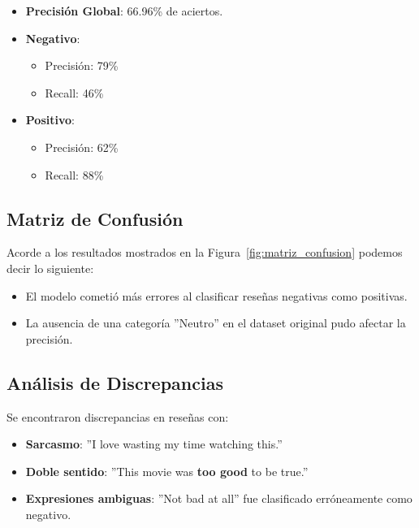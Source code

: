 \documentclass[conference]{IEEEtran}
\begin{document}
\begin{itemize}
    \item \textbf{Precisión Global}: 66.96\% de aciertos.
    \item \textbf{Negativo}:
        \begin{itemize}
            \item Precisión: 79\%
            \item Recall: 46\%
        \end{itemize}
    \item \textbf{Positivo}:
        \begin{itemize}
            \item Precisión: 62\%
            \item Recall: 88\%
        \end{itemize}
\end{itemize}


\subsection{Matriz de Confusión}

Acorde a los resultados mostrados en la Figura~\ref{fig:matriz_confusion} podemos decir lo siguiente:

\begin{itemize}
	\item El modelo cometió más errores al clasificar reseñas negativas como positivas. 
	\item La ausencia de una categoría ''Neutro'' en el dataset original pudo afectar la precisión.
\end{itemize}



\subsection{Análisis de Discrepancias}

Se encontraron discrepancias en reseñas con:
\begin{itemize}
    \item \textbf{Sarcasmo}: ''I love wasting my time watching this.''
    \item \textbf{Doble sentido}: ''This movie was \textbf{too good} to be true.''
    \item \textbf{Expresiones ambiguas}: ''Not bad at all'' fue clasificado erróneamente como negativo.
\end{itemize}
\end{document}
